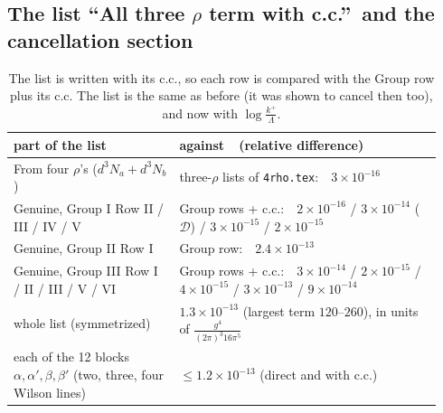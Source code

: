 \documentclass[10pt]{article}
\numberwithin{equation}{section}
\begin{document}
\subsection{The list ``All three $\rho$ term with c.c.''\ and the cancellation section}
\begin{table}[H]\centering\small
\begin{tabular}{p{0.36\linewidth}p{0.58\linewidth}}
\toprule
part of the list & against\ \ (relative difference)\\
\midrule
From four $\rho$'s ($d^3N_a+d^3N_b$) & three-$\rho$ lists of \texttt{4rho.tex}:\ \ $3\times10^{-16}$\\
Genuine, Group I Row II / III / IV / V & Group rows + c.c.:\ \ $2\times10^{-16}$ / $3\times10^{-14}$ ($\mathcal D$) / $3\times10^{-15}$ / $2\times10^{-15}$\\
Genuine, Group II Row I & Group row:\ \ $2.4\times10^{-13}$\\
Genuine, Group III Row I / II / III / V / VI & Group rows + c.c.:\ \ $3\times10^{-14}$ / $2\times10^{-15}$ / $4\times10^{-15}$ / $3\times10^{-13}$ / $9\times10^{-14}$\\
\midrule
whole list (symmetrized) & $1.3\times10^{-13}$ (largest term $120$--$260$), in units of $\frac{g^4}{(2\pi)^3 16\pi^5}$\\
each of the 12 blocks $\alpha,\alpha',\beta,\beta'$ (two, three, four Wilson lines) & $\le1.2\times10^{-13}$ (direct and with c.c.)\\
\bottomrule
\end{tabular}
\caption{The list is written with its c.c., so each row is compared with the Group row plus its c.c. The list is the same as before (it was shown to cancel then too), and now with $\log\frac{k^+}{\Lambda}$.}\label{tab:list}
\end{table}
\end{document}
